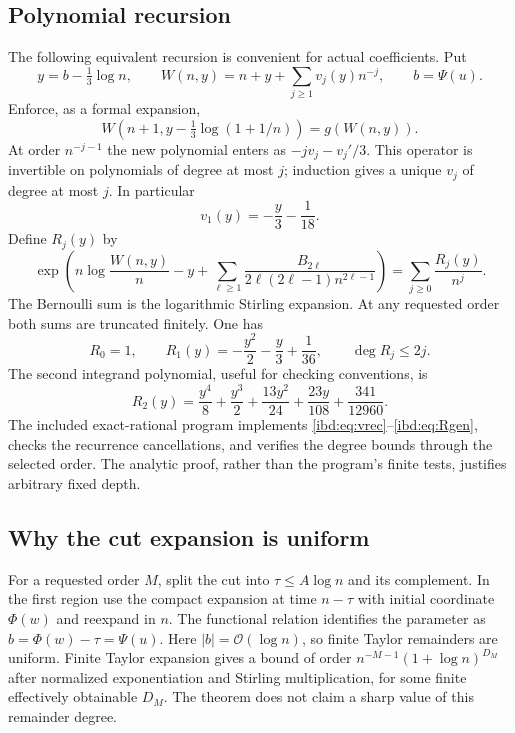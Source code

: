 \documentclass[11pt,letterpaper]{article}
\theoremstyle{remark}\newtheorem{remark}[theorem]{Remark}
\newcommand{\Oh}{\mathcal O}
\begin{document}
\subsection{Polynomial recursion}
The following equivalent recursion is convenient for actual coefficients. Put
\[
 y=b-\tfrac13\log n,\qquad
 W(n,y)=n+y+\sum_{j\geq1}v_j(y)n^{-j},\qquad b=\Psi(u).
\]
Enforce, as a formal expansion,
\begin{equation}\label{ibd:eq:vrec}
 W(n+1,y-\tfrac13\log(1+1/n))=g(W(n,y)).
\end{equation}
At order $n^{-j-1}$ the new polynomial enters as
$-jv_j-v_j'/3$. This operator is invertible on polynomials of degree at most $j$; induction gives a unique $v_j$ of degree at most $j$. In particular
\[
 v_1(y)=-\frac y3-\frac1{18}.
\]
Define $R_j(y)$ by
\begin{equation}\label{ibd:eq:Rgen}
 \exp\left(n\log\frac{W(n,y)}n-y+
 \sum_{\ell\geq1}\frac{B_{2\ell}}{2\ell(2\ell-1)n^{2\ell-1}}\right)
 =\sum_{j\geq0}\frac{R_j(y)}{n^j}.
\end{equation}
The Bernoulli sum is the logarithmic Stirling expansion. At any requested order both sums are truncated finitely. One has
\begin{equation}\label{ibd:eq:R1}
 R_0=1,\qquad R_1(y)=-\frac{y^2}2-\frac y3+\frac1{36},\qquad \deg R_j\leq2j.
\end{equation}
The second integrand polynomial, useful for checking conventions, is
\[
 R_2(y)=\frac{y^4}8+\frac{y^3}2+\frac{13y^2}{24}
          +\frac{23y}{108}+\frac{341}{12960}.
\]
The included exact-rational program implements \eqref{ibd:eq:vrec}--\eqref{ibd:eq:Rgen}, checks the recurrence cancellations, and verifies the degree bounds through the selected order. The analytic proof, rather than the program's finite tests, justifies arbitrary fixed depth.

\subsection{Why the cut expansion is uniform}
For a requested order $M$, split the cut into $\tau\leq A\log n$ and its complement. In the first region use the compact expansion at time $n-\tau$ with initial coordinate $\Phi(w)$ and reexpand in $n$. The functional relation identifies the parameter as $b=\Phi(w)-\tau=\Psi(u)$. Here $|b|=\Oh(\log n)$, so finite Taylor remainders are uniform. Finite Taylor expansion gives a bound of order
$n^{-M-1}(1+\log n)^{D_M}$ after normalized exponentiation and Stirling multiplication, for some finite effectively obtainable $D_M$. The theorem does not claim a sharp value of this remainder degree.
\end{document}
